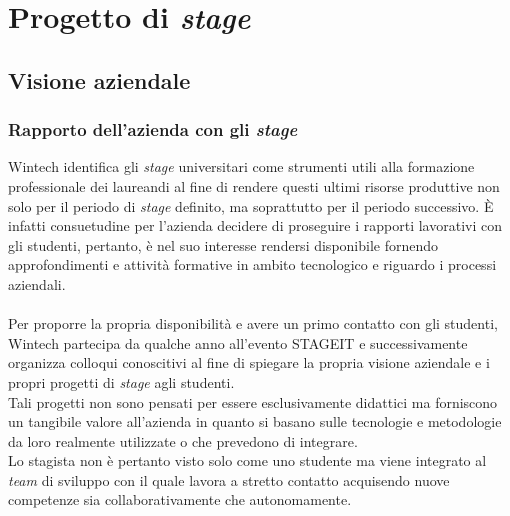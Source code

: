 \chapter{Progetto di \emph{stage}}
\label{cap:progettoDiStage}

\section{Visione aziendale}
\subsection{Rapporto dell'azienda con gli \emph{stage}}
Wintech identifica gli \emph{stage} universitari come strumenti utili alla formazione professionale dei laureandi al fine di rendere questi ultimi risorse produttive non solo per il periodo di \emph{stage} definito, ma soprattutto per il periodo successivo. È infatti consuetudine per l'azienda decidere di proseguire i rapporti lavorativi con gli studenti, pertanto, è nel suo interesse rendersi disponibile fornendo approfondimenti e attività formative in ambito tecnologico e riguardo i processi aziendali.\\\\
Per proporre la propria disponibilità e avere un primo contatto con gli studenti, Wintech partecipa da qualche anno all'evento \gls{STAGEIT} e successivamente organizza colloqui conoscitivi al fine di spiegare la propria visione aziendale e i propri progetti di \emph{stage} agli studenti.\\
Tali progetti non sono pensati per essere esclusivamente didattici ma forniscono un tangibile valore all'azienda in quanto si basano sulle tecnologie e metodologie da loro realmente utilizzate o che prevedono di integrare.\\
Lo stagista non è pertanto visto solo come uno studente ma viene integrato al \emph{team} di sviluppo con il quale lavora a stretto contatto acquisendo nuove competenze sia collaborativamente che autonomamente.\\

